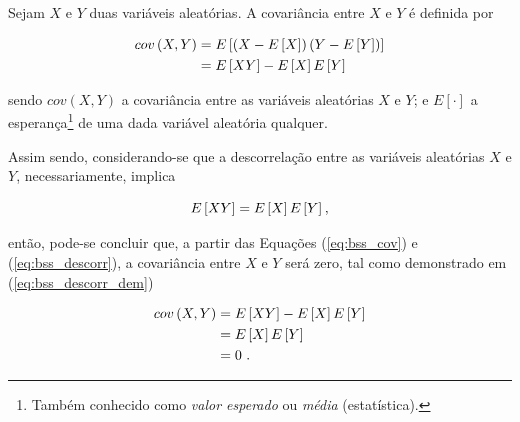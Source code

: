 \begin{definition}[Covariância]
    Sejam $X$ e $Y$ duas variáveis aleatórias. A covariância entre $X$ e $Y$ é definida por

    \begin{equation}
    \begin{aligned}
        cov\left(X, Y\right) & = E\left[\left(X-E\left[X\right]\right)\left(Y-E\left[Y\right]\right)\right] \\
         & = E\left[XY\right] - E\left[X\right] E\left[Y\right]
        \vspace{0.2cm}
        \label{eq:bss_cov}
    \end{aligned}
    \vspace{0.2cm}
    \end{equation}

    \noindent sendo $cov(X, Y)$ a covariância entre as variáveis aleatórias $X$ e $Y$; e $E[\cdot]$ a esperança\footnote{Também conhecido como \textit{valor esperado} ou \textit{média} (estatística).} de uma dada variável aleatória qualquer.
\end{definition}



Assim sendo, considerando-se que a descorrelação entre as variáveis aleatórias $X$ e $Y$, necessariamente, implica

\begin{equation}
    E\left[XY\right] = E\left[X\right] E\left[Y\right]
    \hspace{0.01cm},
    \vspace{0.2cm}
    \label{eq:bss_descorr}
\end{equation}

\noindent então, pode-se concluir que, a partir das Equações (\ref{eq:bss_cov}) e (\ref{eq:bss_descorr}), a covariância entre $X$ e $Y$ será zero, tal como demonstrado em (\ref{eq:bss_descorr_dem})

\begin{equation}
\begin{aligned}
    cov\left(X, Y\right) & = E\left[XY\right] - E\left[X\right] E\left[Y\right] \\
    & = E\left[X\right] E\left[Y\right] \\
    & = 0 \hspace{0.01cm}
    \hspace{0.1cm}.
    \vspace{0.2cm}
    \label{eq:bss_descorr_dem}
\end{aligned}
\vspace{0.2cm}
\end{equation}

